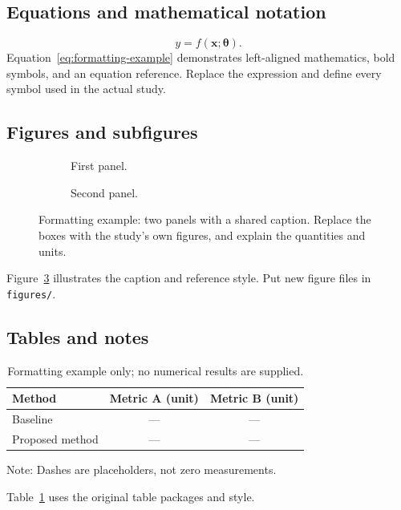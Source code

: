 \documentclass[a4paper,fleqn]{cas-sc}
\newcommand{\figureplaceholder}[2]{%
  \begingroup
  \setlength{\fboxsep}{10pt}%
  \fbox{\parbox[c][#1][c]{\dimexpr\linewidth-2\fboxsep-2\fboxrule\relax}{%
    \centering\sffamily\color{gray}#2}}%
  \endgroup
}
\begin{document}
\subsection{Equations and mathematical notation}
\begin{equation}
  y = f(\bm{x};\bm{\theta}).
  \label{eq:formatting-example}
\end{equation}
Equation~\eqref{eq:formatting-example} demonstrates left-aligned mathematics,
bold symbols, and an equation reference. Replace the expression and define
every symbol used in the actual study.

\subsection{Figures and subfigures}
\begin{figure}[pos=htbp]
  \centering
  \begin{subfigure}{0.47\linewidth}
    \centering
    \figureplaceholder{25mm}{Panel A: TODO}
    \caption{First panel.}
    \label{fig:panel-a}
  \end{subfigure}\hfill
  \begin{subfigure}{0.47\linewidth}
    \centering
    \figureplaceholder{25mm}{Panel B: TODO}
    \caption{Second panel.}
    \label{fig:panel-b}
  \end{subfigure}
  \caption{Formatting example: two panels with a shared caption. Replace the
  boxes with the study's own figures, and explain the quantities and units.}
  \label{fig:formatting-example}
\end{figure}
Figure~\ref{fig:formatting-example} illustrates the caption and reference style.
Put new figure files in \texttt{figures/}.

\subsection{Tables and notes}
\begin{table}[pos=htbp]
  \centering
  \caption{Formatting example only; no numerical results are supplied.}
  \label{tab:formatting-example}
  \begin{threeparttable}
    \begin{tabular}{lcc}
      \toprule
      Method & Metric A (unit) & Metric B (unit) \\
      \midrule
      Baseline & --- & --- \\
      Proposed method & --- & --- \\
      \bottomrule
    \end{tabular}
    \begin{tablenotes}[flushleft]\footnotesize
      \item Note: Dashes are placeholders, not zero measurements.
    \end{tablenotes}
  \end{threeparttable}
\end{table}
Table~\ref{tab:formatting-example} uses the original table packages and style.
\end{document}
